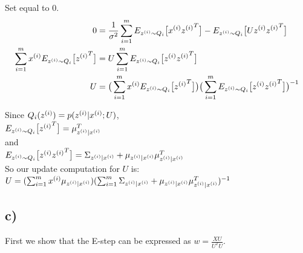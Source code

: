 \documentclass[11pt]{article}
\begin{document}
Set equal to $0$.
\begin{align*}
    0 &= \frac{1}{\sigma^2} \sum_{i=1}^m E_{z^{(i)} \sim Q_i} \big[x^{(i)} {z^{(i)}}^T \big] - E_{z^{(i)} \sim Q_i} \big[ U z^{(i)} {z^{(i)}}^T \big] \\
    \sum_{i=1}^m x^{(i)} E_{z^{(i)} \sim Q_i}\big[{z^{(i)}}^T\big] &= U \sum_{i=1}^m E_{z^{(i)} \sim Q_i} \big[ z^{(i)} {z^{(i)}}^T \big] \\
    U &= \big(\sum_{i=1}^m x^{(i)} E_{z^{(i)} \sim Q_i} \big[ {z^{(i)}}^T \big] \big) \big(\sum_{i=1}^m E_{z^{(i)} \sim Q_i} \big[z^{(i)} {z^{(i)}}^T \big] \big)^{-1} \\
\end{align*}

Since $Q_i(z^{(i)}) = p(z^{(i)}|x^{(i)}; U)$, \\
$E_{z^{(i)} \sim Q_i} \big[ {z^{(i)}}^T \big] = \mu_{z^{(i)}|x^{(i)}}^T$ \\
and \\
$E_{z^{(i)} \sim Q_i} \big[z^{(i)} {z^{(i)}}^T \big] = \Sigma_{z^{(i)}|x^{(i)}} + \mu_{z^{(i)}|x^{(i)}} \mu_{z^{(i)}|x^{(i)}}^T$ \\

So our update computation for $U$ is:\\
$U = (\sum_{i=1}^m x^{(i)} \mu_{z^{(i)}|x^{(i)}})(\sum_{i=1}^m \Sigma_{z^{(i)}|x^{(i)}} + \mu_{z^{(i)}|x^{(i)}} \mu_{z^{(i)}|x^{(i)}}^T)^{-1}$ \\

\subsection*{c)}
First we show that the E-step can be expressed as $w = \frac{XU}{U^T U}$.
\end{document}
